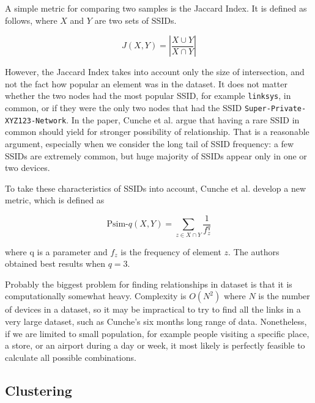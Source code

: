 \documentclass[12pt,a4paper,oneside,pdftex]{report}
\begin{document}
A simple metric for comparing two samples is the Jaccard Index. It is defined as follows, where $X$ and $Y$ are two sets of SSIDs.

$$J(X,Y) = \left| \frac{X \cup Y}{X \cap Y} \right| $$

However, the Jaccard Index takes into account only the size of intersection, and not the fact how popular an element was in the dataset. It does not matter whether the two nodes had the most popular SSID, for example \texttt{linksys}, in common, or if they were the only two nodes that had the SSID \texttt{Super-Private-XYZ123-Network}. In the paper, Cunche et al. argue that having a rare SSID in common should yield for stronger possibility of relationship. That is a reasonable argument, especially when we consider the long tail of SSID frequency: a few SSIDs are extremely common, but huge majority of SSIDs appear only in one or two devices.

To take these characteristics of SSIDs into account, Cunche et al. develop a new metric, which is defined as 

$$\text{Psim-}q(X,Y) = \sum_{z \in X \cap Y} \frac{1}{f_z^q}$$

where q is a parameter and $f_z$ is the frequency of element $z$. The authors obtained best results when $q=3$.~\cite{cunche2014linking}

Probably the biggest problem for finding relationships in dataset is that it is computationally somewhat heavy. Complexity is $O(N^2)$ where $N$ is the number of devices in a dataset, so it may be impractical to try to find all the links in a very large dataset, such as Cunche's six months long range of data. Nonetheless, if we are limited to small population, for example people visiting a specific place, a store, or an airport during a day or week, it most likely is perfectly feasible to calculate all possible combinations.


\subsection{Clustering}
\label{subsec:clustering}
\end{document}
